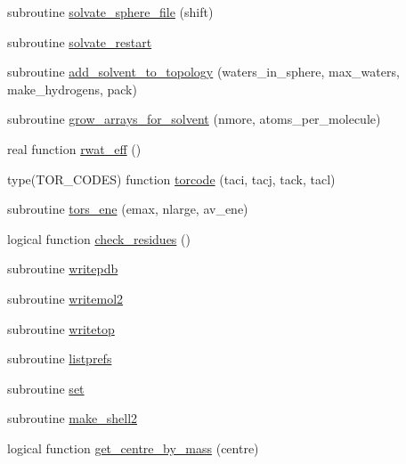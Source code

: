 \begin{DoxyCompactItemize}
\item 
subroutine \hyperlink{classprep_a41752fc7d46be8f022fbba88f159f4d8}{solvate\-\_\-sphere\-\_\-file} (shift)
\item 
subroutine \hyperlink{classprep_a5c7e6488cce390d096ff1ba62f9f7e3b}{solvate\-\_\-restart}
\item 
subroutine \hyperlink{classprep_ada43fa39af17de1fca637c3702966043}{add\-\_\-solvent\-\_\-to\-\_\-topology} (waters\-\_\-in\-\_\-sphere, max\-\_\-waters, make\-\_\-hydrogens, pack)
\item 
subroutine \hyperlink{classprep_a83cffe3873feafd7ebdef521099d5bac}{grow\-\_\-arrays\-\_\-for\-\_\-solvent} (nmore, atoms\-\_\-per\-\_\-molecule)
\item 
real function \hyperlink{classprep_aede855ae502ac617ebdefee64cf18581}{rwat\-\_\-eff} ()
\item 
type(T\-O\-R\-\_\-\-C\-O\-D\-E\-S) function \hyperlink{classprep_a65595c8aac3bb35b611e3222ccd26241}{torcode} (taci, tacj, tack, tacl)
\item 
subroutine \hyperlink{classprep_a7ad81d7c12ae2e8a3ddaa2819ff9de90}{tors\-\_\-ene} (emax, nlarge, av\-\_\-ene)
\item 
logical function \hyperlink{classprep_aac95240e79d8797c485ec2c4d7ff7d28}{check\-\_\-residues} ()
\item 
subroutine \hyperlink{classprep_a86389b7be94682ea34144a6086ebf289}{writepdb}
\item 
subroutine \hyperlink{classprep_ad083f95844e256edae2a0a1f08770477}{writemol2}
\item 
subroutine \hyperlink{classprep_a9c1837f9f9cc480111bc869021782ba7}{writetop}
\item 
subroutine \hyperlink{classprep_a98a2bbf68312eda5398cd628a5acad6d}{listprefs}
\item 
subroutine \hyperlink{classprep_a970e6693d83b14e44100bacdd3ad4132}{set}
\item 
subroutine \hyperlink{classprep_a590bd98683520ed1b1edce0bdf78b337}{make\-\_\-shell2}
\item 
logical function \hyperlink{classprep_ac5cb1bd82cdabbd55089747c70946e9f}{get\-\_\-centre\-\_\-by\-\_\-mass} (centre)
\end{DoxyCompactItemize}
